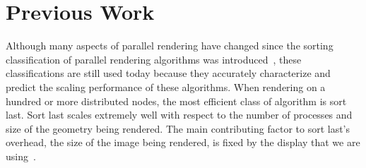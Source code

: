 \documentclass{sig-alternate}
\newcommand*{\lcite}[1]{~\cite{#1}}
\newcommand*{\keyterm}[1]{\emph{#1}}
\begin{document}

\section{Previous Work}
\label{sec:PreviousWork}

Although many aspects of parallel rendering have changed since the sorting
classification of parallel rendering algorithms was
introduced\lcite{Molnar1994}, these classifications are still used today
because they accurately characterize and predict the scaling performance of
these algorithms.  When rendering on a hundred or more distributed nodes,
the most efficient class of algorithm is sort last.  Sort last scales
extremely well with respect to the number of processes and size of the
geometry being rendered.  The main contributing factor to sort last's
overhead, the size of the image being rendered, is fixed by the display
that we are using\lcite{Wylie2001}.
\end{document}
